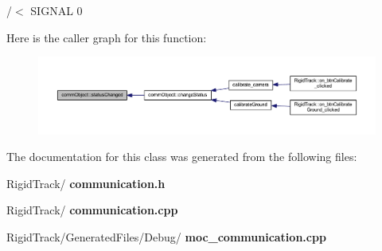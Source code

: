 /$<$ S\+I\+G\+N\+AL 0 

Here is the caller graph for this function\+:\nopagebreak
\begin{figure}[H]
\begin{center}
\leavevmode
\includegraphics[width=350pt]{classcomm_object_adccf5b5946d35d5cf6d76f367f93e335_icgraph}
\end{center}
\end{figure}


The documentation for this class was generated from the following files\+:\begin{DoxyCompactItemize}
\item 
Rigid\+Track/\textbf{ communication.\+h}\item 
Rigid\+Track/\textbf{ communication.\+cpp}\item 
Rigid\+Track/\+Generated\+Files/\+Debug/\textbf{ moc\+\_\+communication.\+cpp}\end{DoxyCompactItemize}
